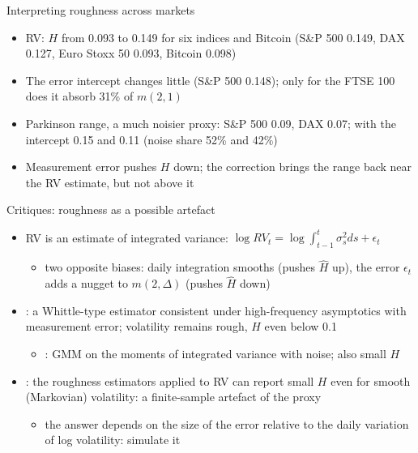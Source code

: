 \begin{frame}{Interpreting roughness across markets}
\itemsize{\small}
\begin{itemize}
    \item RV: $H$ from 0.093 to 0.149 for six indices and Bitcoin (S\&P 500 0.149, DAX 0.127, Euro Stoxx 50 0.093, Bitcoin 0.098)
    \item The error intercept changes little (S\&P 500 0.148); only for the FTSE 100 does it absorb 31\% of $m(2, 1)$
    \item Parkinson range, a much noisier proxy: S\&P 500 0.09, DAX 0.07; with the intercept 0.15 and 0.11 (noise share 52\% and 42\%)
    \item Measurement error pushes $H$ down; the correction brings the range back near the RV estimate, but not above it
\end{itemize}
\end{frame}

\begin{frame}{Critiques: roughness as a possible artefact}
\itemsize{\small}
\begin{itemize}
    \item RV is an estimate of integrated variance: $\log RV_t = \log\int_{t-1}^t\sigma_s^2ds + \epsilon_t$
    \begin{itemize}
        \item two opposite biases: daily integration smooths (pushes $\hat H$ up), the error $\epsilon_t$ adds a nugget to $m(2, \Delta)$ (pushes $\hat H$ down)
    \end{itemize}
    \item {}: a Whittle-type estimator consistent under high-frequency asymptotics with measurement error; volatility remains rough, $H$ even below 0.1
    \begin{itemize}
        \item {}: GMM on the moments of integrated variance with noise; also small $H$
    \end{itemize}
    \item {}: the roughness estimators applied to RV can report small $H$ even for smooth (Markovian) volatility: a finite-sample artefact of the proxy
    \begin{itemize}
        \item the answer depends on the size of the error relative to the daily variation of log volatility: simulate it
    \end{itemize}
\end{itemize}
\end{frame}

